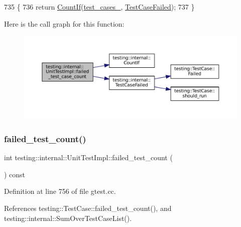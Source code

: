 \begin{DoxyCode}
735                                                \{
736   \textcolor{keywordflow}{return} \hyperlink{namespacetesting_1_1internal_a1e77a774d910346eff11a86d8df783a5}{CountIf}(\hyperlink{classtesting_1_1internal_1_1UnitTestImpl_a79ec0f733ada2898efd1a7fbd8587fb3}{test\_cases\_}, \hyperlink{namespacetesting_1_1internal_a53454b6089c1c5b25319caa9de6c5c02}{TestCaseFailed});
737 \}
\end{DoxyCode}
Here is the call graph for this function\+:
\nopagebreak
\begin{figure}[H]
\begin{center}
\leavevmode
\includegraphics[width=350pt]{classtesting_1_1internal_1_1UnitTestImpl_af981a537231e1dad4c1f092c6fdec1ff_cgraph}
\end{center}
\end{figure}
\mbox{\label{classtesting_1_1internal_1_1UnitTestImpl_ad0abe95b66466268363d7fa407bac41b}} 
\subsubsection{\texorpdfstring{failed\+\_\+test\+\_\+count()}{failed\_test\_count()}}
{\footnotesize\ttfamily int testing\+::internal\+::\+Unit\+Test\+Impl\+::failed\+\_\+test\+\_\+count (\begin{DoxyParamCaption}{ }\end{DoxyParamCaption}) const}



Definition at line 756 of file gtest.\+cc.



References testing\+::\+Test\+Case\+::failed\+\_\+test\+\_\+count(), and testing\+::internal\+::\+Sum\+Over\+Test\+Case\+List().



